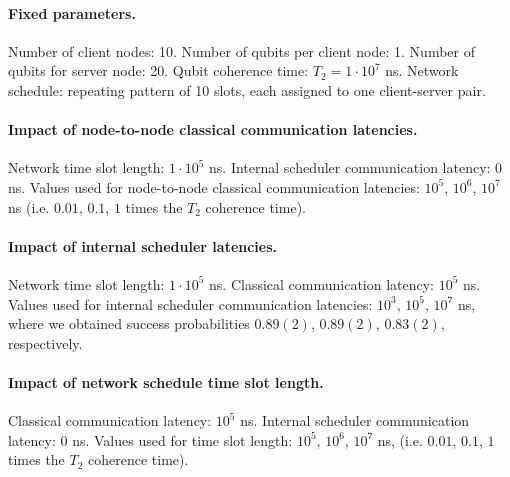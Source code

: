 \paragraph{Fixed parameters.}
Number of client nodes: 10.
Number of qubits per client node: 1.
Number of qubits for server node: 20.
Qubit coherence time: $T_2 = 1\cdot 10^7$ ns.
Network schedule: repeating pattern of 10 slots, each assigned to one client-server pair.

\paragraph{Impact of node-to-node classical communication latencies.}
Network time slot length: $1\cdot 10^5$ ns.
Internal scheduler communication latency: $0$ ns.
Values used for node-to-node classical communication latencies: $10^5$, $10^6$, $10^7$ ns (i.e. $0.01$, $0.1$, $1$ times the $T_2$ coherence time).

\paragraph{Impact of internal scheduler latencies.}
Network time slot length: $1\cdot 10^5$ ns.
Classical communication latency: $10^5$ ns.
Values used for internal scheduler communication latencies: $10^3$, $10^5$, $10^7$ ns, where we obtained success probabilities $0.89(2)$, $0.89(2)$, $0.83(2)$, respectively.

\paragraph{Impact of network schedule time slot length.}
Classical communication latency: $10^5$ ns.
Internal scheduler communication latency: $0$ ns.
Values used for time slot length: $10^5$, $10^6$, $10^7$ ns, (i.e. $0.01$, $0.1$, $1$ times the $T_2$ coherence time).
